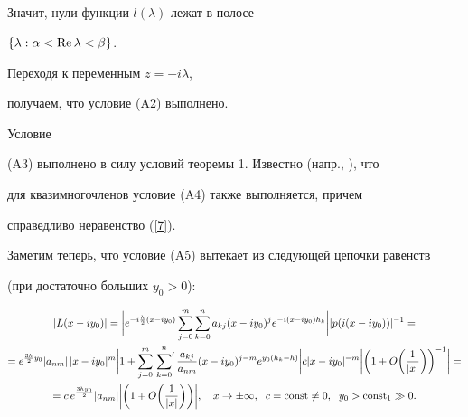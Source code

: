 \begin{pf}
\begin{equation}
\begin{split}
\end{split} 


\end{equation}


Значит, нули функции $l(\lambda)$ лежат в полосе 


$\{\lambda:\alpha<\operatorname{Re}\lambda<\beta\}$. 


 


Переходя к переменным $z=-i\lambda$, 


получаем, что условие (A2) выполнено. 


Условие 


(A3) выполнено в силу условий теоремы 1. Известно (напр., \cite{2}), что 


для квазимногочленов условие (A4) также выполняется, причем


справедливо неравенство (\ref{7}). 


 


Заметим теперь, что условие (A5) вытекает из следующей цепочки равенств 


(при достаточно больших $y_0>0$): 


\begin{multline} 


\label{19} 


|L(x-iy_0)|=\bigg|e^{-i\frac{h}{2}(x-iy_0)}\sum^m_{j=0} 


\sum^n_{k=0}a_{kj}(x-iy_0)^j 


e^{-i(x-iy_0)h_k}\bigg||p(i(x-iy_0))|^{-1}= \\ 


=e^{\frac{3h}{2}y_0}|a_{nm}|\,|x-iy_0|^m\bigg|1+ 


\sum^m_{j=0}\sideset{}{'}\sum^n_{k=0}\frac{a_{kj}}{a_{nm}} 


(x-iy_0)^{j-m}e^{y_0(h_k-h)}\bigg| 


c|x-iy_0|^{-m}\bigg|\bigg(1+O\bigg(\frac{1}{|x|}\bigg)\bigg)^{-1} 


\bigg|= \\ 


=c\,e^{\frac{3h y_0}{2}}|a_{nm}|\bigg|\bigg(1+ 


O\bigg(\frac{1}{|x|}\bigg)\bigg)\bigg|,\quad x\to\pm\infty, 


\ \;c=\const\ne 0,\ \; y_0>\const_1\gg 0. 


\end{multline} 


 



\end{pf}
